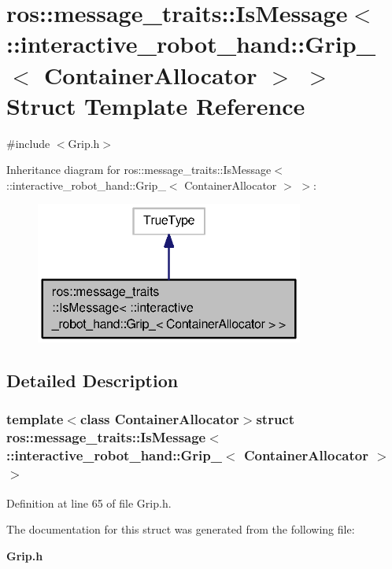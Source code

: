 \section{ros\-:\-:message\-\_\-traits\-:\-:Is\-Message$<$ \-:\-:interactive\-\_\-robot\-\_\-hand\-:\-:Grip\-\_\-$<$ Container\-Allocator $>$ $>$ Struct Template Reference}
\label{structros_1_1message__traits_1_1IsMessage_3_01_1_1interactive__robot__hand_1_1Grip___3_01ContainerAllocator_01_4_01_4}


{\ttfamily \#include $<$Grip.\-h$>$}



Inheritance diagram for ros\-:\-:message\-\_\-traits\-:\-:Is\-Message$<$ \-:\-:interactive\-\_\-robot\-\_\-hand\-:\-:Grip\-\_\-$<$ Container\-Allocator $>$ $>$\-:
\nopagebreak
\begin{figure}[H]
\begin{center}
\leavevmode
\includegraphics[width=250pt]{structros_1_1message__traits_1_1IsMessage_3_01_1_1interactive__robot__hand_1_1Grip___3_01Contain218cdb0578a29afdbbca99841ab6f695}
\end{center}
\end{figure}


\subsection{Detailed Description}
\subsubsection*{template$<$class Container\-Allocator$>$struct ros\-::message\-\_\-traits\-::\-Is\-Message$<$ \-::interactive\-\_\-robot\-\_\-hand\-::\-Grip\-\_\-$<$ Container\-Allocator $>$ $>$}



Definition at line 65 of file Grip.\-h.



The documentation for this struct was generated from the following file\-:\begin{DoxyCompactItemize}
\item 
{\bf Grip.\-h}\end{DoxyCompactItemize}

